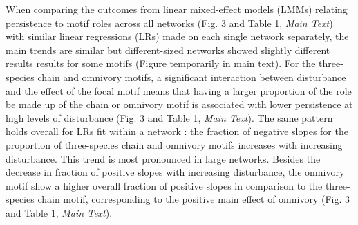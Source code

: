\documentclass[12pt]{article}
\begin{document}
\begin{spacing}{2.0}
    When comparing the outcomes from linear mixed-effect models (LMMs) relating persistence to motif roles across all networks (Fig. 3 and Table 1, \emph{Main Text}) with similar linear regressions (LRs) made on each single network separately, the main trends are similar but different-sized networks showed slightly different results results for some motifs (Figure temporarily in main text).%
    For the three-species chain and omnivory motifs, a significant interaction between disturbance and the effect of the focal motif means that having a larger proportion of the role be made up of the chain or omnivory motif is associated with lower persistence at high levels of disturbance (Fig. 3 and Table 1, \emph{Main Text}). 
    The same pattern holds overall for LRs fit within a network  %
    : the fraction of negative slopes for the proportion of three-species chain and omnivory motifs increases with increasing disturbance. 
    This trend is most pronounced in large networks.%
    Besides the decrease in fraction of positive slopes with increasing disturbance, the omnivory motif show a higher overall fraction of positive slopes in comparison to the three-species chain motif, corresponding to the positive main effect of omnivory (Fig. 3 and Table 1, \emph{Main Text}). 


    
    

\end{spacing}
\end{document}
